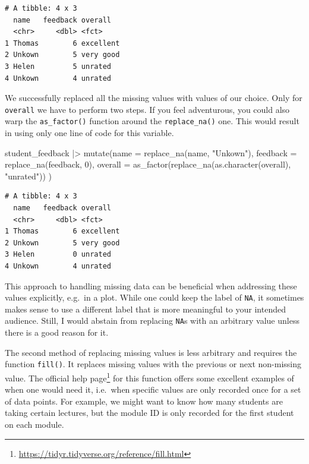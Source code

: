 \documentclass[
  letterpaper,
]{krantz}
\makeatletter
\newenvironment{Shaded}{\begin{snugshade}}{\end{snugshade}}
\newcommand{\AttributeTok}[1]{\textcolor[rgb]{0.40,0.45,0.13}{#1}}
\newcommand{\DecValTok}[1]{\textcolor[rgb]{0.68,0.00,0.00}{#1}}
\newcommand{\FunctionTok}[1]{\textcolor[rgb]{0.28,0.35,0.67}{#1}}
\newcommand{\NormalTok}[1]{\textcolor[rgb]{0.00,0.23,0.31}{#1}}
\newcommand{\SpecialCharTok}[1]{\textcolor[rgb]{0.37,0.37,0.37}{#1}}
\newcommand{\StringTok}[1]{\textcolor[rgb]{0.13,0.47,0.30}{#1}}
\renewcommand{\href}[2]{#2\footnote{\url{#1}}}
\newenvironment{kframe}{%
\medskip{}
\setlength{\fboxsep}{.8em}
 \def\at@end@of@kframe{}%
 \ifinner\ifhmode%
  \def\at@end@of@kframe{\end{minipage}}%
  \begin{minipage}{\columnwidth}%
 \fi\fi%
 \def\FrameCommand##1{\hskip\@totalleftmargin \hskip-\fboxsep
 \colorbox{shadecolor}{##1}\hskip-\fboxsep
     \hskip-\linewidth \hskip-\@totalleftmargin \hskip\columnwidth}%
 \MakeFramed {\advance\hsize-\width
   \@totalleftmargin\z@ \linewidth\hsize
   \@setminipage}}%
 {\par\unskip\endMakeFramed%
 \at@end@of@kframe}
\renewenvironment{Shaded}{\begin{kframe}}{\end{kframe}}
\makeatother
\begin{document}
\begin{verbatim}
# A tibble: 4 x 3
  name   feedback overall  
  <chr>     <dbl> <fct>    
1 Thomas        6 excellent
2 Unkown        5 very good
3 Helen         5 unrated  
4 Unkown        4 unrated  
\end{verbatim}

We successfully replaced all the missing values with values of our
choice. Only for \texttt{overall} we have to perform two steps. If you
feel adventurous, you could also warp the \texttt{as\_factor()} function
around the \texttt{replace\_na()} one. This would result in using only
one line of code for this variable.

\begin{Shaded}
\begin{Highlighting}[]
\NormalTok{student\_feedback }\SpecialCharTok{|\textgreater{}}
  \FunctionTok{mutate}\NormalTok{(}\AttributeTok{name =} \FunctionTok{replace\_na}\NormalTok{(name, }\StringTok{"Unkown"}\NormalTok{),}
         \AttributeTok{feedback =} \FunctionTok{replace\_na}\NormalTok{(feedback, }\DecValTok{0}\NormalTok{),}
         \AttributeTok{overall =} \FunctionTok{as\_factor}\NormalTok{(}\FunctionTok{replace\_na}\NormalTok{(}\FunctionTok{as.character}\NormalTok{(overall),}
                                        \StringTok{"unrated"}\NormalTok{))}
\NormalTok{         )}
\end{Highlighting}
\end{Shaded}

\begin{verbatim}
# A tibble: 4 x 3
  name   feedback overall  
  <chr>     <dbl> <fct>    
1 Thomas        6 excellent
2 Unkown        5 very good
3 Helen         0 unrated  
4 Unkown        4 unrated  
\end{verbatim}

This approach to handling missing data can be beneficial when addressing
these values explicitly, e.g.~in a plot. While one could keep the label
of \texttt{NA}, it sometimes makes sense to use a different label that
is more meaningful to your intended audience. Still, I would abstain
from replacing \texttt{NA}s with an arbitrary value unless there is a
good reason for it.

The second method of replacing missing values is less arbitrary and
requires the function \texttt{fill()}. It replaces missing values with
the previous or next non-missing value. The
\href{https://tidyr.tidyverse.org/reference/fill.html}{official help
page} for this function offers some excellent examples of when one would
need it, i.e.~when specific values are only recorded once for a set of
data points. For example, we might want to know how many students are
taking certain lectures, but the module ID is only recorded for the
first student on each module.
\end{document}
